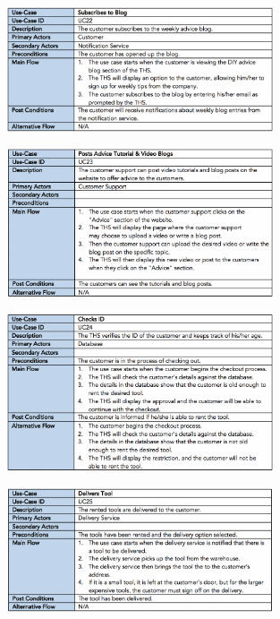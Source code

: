 \begin{figure}[H]
      \centering
      \includegraphics[trim = 0 0 0 0, clip, width=0.7\textwidth]{TempImg/UC22.png}
 \end{figure}

\begin{figure}[H]
      \centering
      \includegraphics[trim = 0 0 0 0, clip, width=0.7\textwidth]{TempImg/UC23.png}
 \end{figure}

\begin{figure}[H]
      \centering
      \includegraphics[trim = 0 0 0 0, clip, width=0.7\textwidth]{TempImg/UC24.png}
 \end{figure}

\begin{figure}[H]
      \centering
      \includegraphics[trim = 0 0 0 0, clip, width=0.7\textwidth]{TempImg/UC25.png}
 \end{figure}

